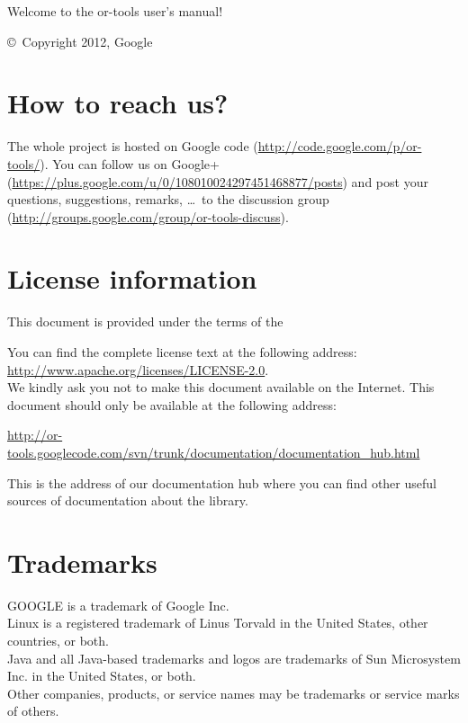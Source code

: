 {%
\begin{titlepage}
{\Large Welcome to the or-tools user's manual!}\\


\copyright\ Copyright 2012, Google\\



\section*{How to reach us?}
The whole project  is hosted on Google code (\url{http://code.google.com/p/or-tools/}). You can follow us on Google+ (\url{https://plus.google.com/u/0/108010024297451468877/posts}) and post 
your questions, suggestions, remarks, \ldots\ to the  discussion group (\url{http://groups.google.com/group/or-tools-discuss}).

\section*{License information}
This document is provided under the terms of the 
\begin{center}
  \begin{large}\end{large}
\end{center}
You can find the complete license text at the following address: \url{http://www.apache.org/licenses/LICENSE-2.0}.\\

We kindly ask you not to make this document available on the Internet. This document should only be available at the following address:
\begin{center}
  \url{http://or-tools.googlecode.com/svn/trunk/documentation/documentation_hub.html}
\end{center}
This is the address of our documentation hub where you can find other useful sources of documentation about the  library.

\section*{Trademarks}
GOOGLE is a trademark of Google Inc.\\
Linux is a registered trademark of Linus Torvald in the United States, other countries, or both.\\
Java and all Java-based trademarks and logos are trademarks of Sun Microsystem Inc. in the United States, or both.\\
Other companies, products, or service names may be trademarks or service marks of others.


\end{titlepage}}
